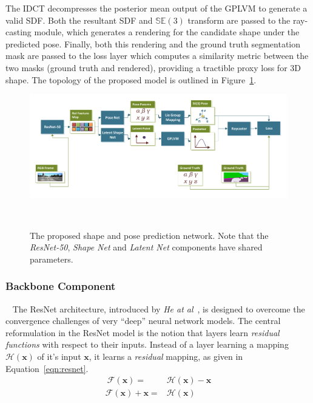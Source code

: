 The IDCT decompresses the posterior mean output of the GPLVM to generate a valid SDF\@. Both the 
resultant SDF and \( \mathbb{SE}(3) \) transform are passed to the ray-casting module, which generates 
a rendering for the candidate shape under the predicted pose. Finally, both this rendering and the ground truth 
segmentation mask are passed to the loss layer which computes a similarity metric between the two masks (ground truth and rendered), 
providing a tractible proxy loss for 3D shape. The topology of the proposed model is outlined in Figure~\ref{figure:spp_pipeline}.
\begin{landscape}
  \begin{figure}[!htbp]
    \centering
    \includegraphics[width=\linewidth]{figures/spp/model.pdf}
    \caption[Shape and Pose Prediction Network]{The proposed shape and pose prediction network. 
    Note that the \textit{ResNet-50}, \textit{Shape Net} and \textit{Latent Net} components have 
    shared parameters.}
~\label{figure:spp_pipeline}
  \end{figure}
\end{landscape}

\subsubsection{Backbone Component}
~\label{subsub:spp_neural_backbone}
The ResNet architecture, introduced by \textit{He at al}~\cite{He2015}, is designed to overcome the 
convergence challenges of very ``deep'' neural network models. The central reformulation in the 
ResNet model is the notion that layers learn \textit{residual functions} with respect to 
their inputs. Instead of a layer learning a mapping \( \mathcal{H}(\bm{x}) \) of it's input \( \bm{x} \), 
it learns a \textit{residual} mapping, as given in Equation~\ref{eqn:resnet}.
\begin{align}
~\label{eqn:resnet}
  \mathcal{F}(\bm{x}) ={}& \mathcal{H}(\bm{x}) - \bm{x}\\
  \mathcal{F}(\bm{x}) + \bm{x} ={}& \mathcal{H}(\bm{x})
\end{align}

